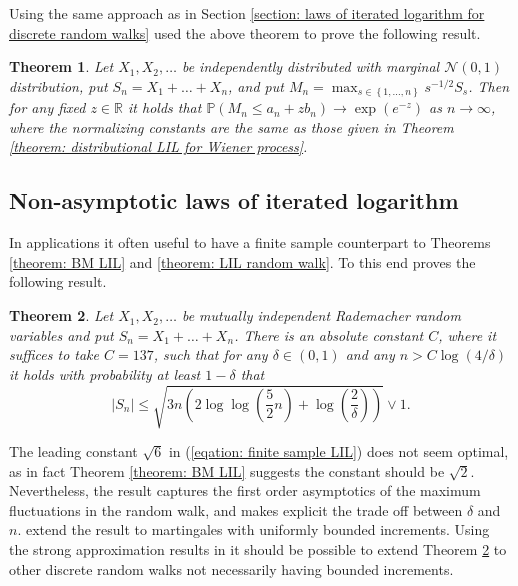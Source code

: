 \documentclass{article}
\newtheorem{theorem}{Theorem}[section]
\begin{document}
Using the same approach as in Section \ref{section: laws of iterated logarithm for discrete random walks} \cite{darling1956limit} used the above theorem to prove the following result. 

\begin{theorem}
Let $X_1, X_2, \dots$ be independently distributed with marginal $\mathcal{N} (0,1)$ distribution, put $S_n = X_1 + \dots + X_n$, and put $M_n = \max_{s \in \left \{ 1, \dots, n \right \}} s^{-1/2} S_s$. Then for any fixed $z \in \mathbb{R}$ it holds that $\mathbb{P} \left ( M_n \leq a_n + z b_n \right ) \rightarrow \exp (e^{-z})$ as $n \rightarrow \infty$, where the normalizing constants are the same as those given in Theorem \ref{theorem: distributional LIL for Wiener process}. 
\label{theorem: distributional LIL for random walk}
\end{theorem}

\subsection{Non-asymptotic laws of iterated logarithm}

In applications it often useful to have a finite sample counterpart to Theorems \ref{theorem: BM LIL} and \ref{theorem: LIL random walk}. To this end \cite{balsubramani2014sharp} proves the following result. 

\begin{theorem}
Let $X_1, X_2, \dots$ be mutually independent Rademacher random variables and put $S_n = X_1 + \dots + X_n$. There is an absolute constant $C$, where it suffices to take $C = 137$, such that for any $\delta \in (0,1)$ and any $n > C \log (4 / \delta)$ it holds with probability at least $1 - \delta$ that
\begin{equation}
\left | S_n \right | \leq \sqrt{3n \left( 2 \log \log \left ( \frac{5}{2} n \right ) + \log \left ( \frac{2}{\delta} \right ) \right )} \vee 1. 
\label{eqation: finite sample LIL}
\end{equation}
\label{theorem: finite sample LIL}
\end{theorem}

The leading constant $\sqrt{6}$ in (\ref{eqation: finite sample LIL}) does not seem optimal, as in fact Theorem \ref{theorem: BM LIL} suggests the constant should be $\sqrt{2}$. Nevertheless, the result captures the first order asymptotics of the maximum fluctuations in the random walk, and makes explicit the trade off between $\delta$ and $n$. \cite{balsubramani2014sharp} extend the result to martingales with uniformly bounded increments. Using the strong approximation results in \cite{komlos1975approximation} it should be possible to extend Theorem \ref{theorem: finite sample LIL} to other discrete random walks not necessarily having bounded increments. 

\newpage



\end{document}
